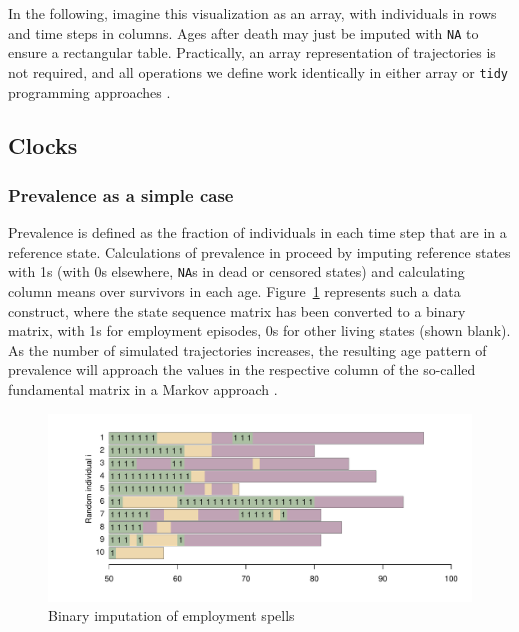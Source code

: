 \documentclass[a4paper,left=1.25cm,right=1.25cm,top=1.25cm,bottom=1.25cm]{article}
\begin{document}
 In the following, imagine this visualization as an array, with individuals in rows and time steps in columns. Ages after death may just be imputed with \texttt{NA} to ensure a rectangular table. Practically, an array representation of trajectories is not required, and all operations we define work identically in either array or \texttt{tidy} programming approaches \citep{wickham2014tidy}.

\FloatBarrier

\subsection{Clocks}
\label{sec:clocks}

\subsubsection{Prevalence as a simple case}
Prevalence is defined as the fraction of individuals in each time step that are in a reference state. Calculations of prevalence in proceed by imputing reference states with 1s (with 0s elsewhere, \texttt{NA}s in dead or censored states) and calculating column means over survivors in each age. Figure~\ref{fig:seq10ones} represents such a data construct, where the state sequence matrix has been converted to a binary matrix, with 1s for employment episodes, 0s for other living states (shown blank). As the number of simulated trajectories increases, the resulting age pattern of prevalence will approach the values in the respective column of the so-called fundamental matrix in a Markov approach \citep{caswell2018matrix}.

\begin{figure}[ht!]
\centering
\includegraphics[scale=.5]{Figures/Seq10ones.pdf}
\caption{Binary imputation of employment spells}
\label{fig:seq10ones}
\end{figure}
\end{document}
